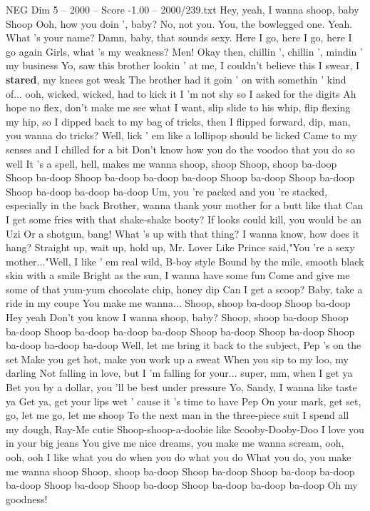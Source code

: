 \begin{textsample}{NEG Dim 5 – 2000 – Score -1.00 – 2000/239.txt}  \label{ex:f5_neg_038}
Hey, yeah, I wanna shoop, baby Shoop Ooh, how you doin ', baby?
No, not you.
You, the bowlegged one.
Yeah.
What 's your name?
Damn, baby, that sounds sexy.
Here I go, here I go, here I go again Girls, what 's my weakness?
Men!
Okay then, chillin ', chillin ', mindin ' my business Yo, saw this brother lookin ' at me, I couldn't believe this I swear, I \textbf{stared}, my knees got weak The brother had it goin ' on with somethin ' kind of... ooh, wicked, wicked, had to kick it I 'm not shy so I asked for the digits Ah hope no flex, don't make me see what I want, slip slide to his whip, flip flexing my hip, so I dipped back to my bag of tricks, then I flipped forward, dip, man, you wanna do tricks?
Well, lick ' em like a lollipop should be licked Came to my senses and I chilled for a bit Don't know how you do the voodoo that you do so well It 's a spell, hell, makes me wanna shoop, shoop Shoop, shoop ba-doop Shoop ba-doop Shoop ba-doop ba-doop ba-doop Shoop ba-doop Shoop ba-doop Shoop ba-doop ba-doop ba-doop Um, you 're packed and you 're stacked, especially in the back Brother, wanna thank your mother for a butt like that Can I get some fries with that shake-shake booty?
If looks could kill, you would be an Uzi Or a shotgun, bang!
What 's up with that thing?
I wanna know, how does it hang?
Straight up, wait up, hold up, Mr.
Lover Like Prince said,"You 're a sexy mother..."Well, I like ' em real wild, B-boy style Bound by the mile, smooth black skin with a smile Bright as the sun, I wanna have some fun Come and give me some of that yum-yum chocolate chip, honey dip Can I get a scoop?
Baby, take a ride in my coupe You make me wanna...
Shoop, shoop ba-doop Shoop ba-doop Hey yeah Don't you know I wanna shoop, baby?
Shoop, shoop ba-doop Shoop ba-doop Shoop ba-doop ba-doop ba-doop Shoop ba-doop Shoop ba-doop Shoop ba-doop ba-doop ba-doop Well, let me bring it back to the subject, Pep 's on the set Make you get hot, make you work up a sweat When you sip to my loo, my darling Not falling in love, but I 'm falling for your... super, mm, when I get ya Bet you by a dollar, you 'll be best under pressure Yo, Sandy, I wanna like taste ya Get ya, get your lips wet ' cause it 's time to have Pep On your mark, get set, go, let me go, let me shoop To the next man in the three-piece suit I spend all my dough, Ray-Me cutie Shoop-shoop-a-doobie like Scooby-Dooby-Doo I love you in your big jeans You give me nice dreams, you make me wanna scream, ooh, ooh, ooh I like what you do when you do what you do What you do, you make me wanna shoop Shoop, shoop ba-doop Shoop ba-doop Shoop ba-doop ba-doop ba-doop Shoop ba-doop Shoop ba-doop Shoop ba-doop ba-doop ba-doop Oh my goodness!

\end{textsample}
